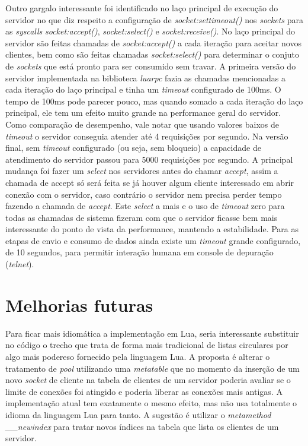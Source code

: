 \documentclass[11pt]{article}
\begin{document}
Outro gargalo interessante foi identificado no laço principal de execução do
servidor no que diz respeito a configuração de \textit{socket:settimeout()} nos
\textit{sockets} para as \textit{syscalls} \textit{socket:accept()},
\textit{socket:select()} e \textit{socket:receive()}. No laço principal do
servidor são feitas chamadas de \textit{socket:accept()} a cada iteração para
aceitar novos clientes, bem como são feitas chamadas \textit{socket:select()}
para determinar o conjuto de \textit{sockets} que está pronto para ser consumido
sem travar. A primeira versão do servidor implementada na biblioteca
\textit{luarpc} fazia as chamadas mencionadas a cada iteração do laço principal
e tinha um \textit{timeout} configurado de 100ms. O tempo de 100ms pode parecer
pouco, mas quando somado a cada iteração do laço principal, ele tem um efeito
muito grande na performance geral do servidor. Como comparação de desempenho,
vale notar que usando valores baixos de \textit{timeout} o servidor conseguia
atender até 4 requisições por segundo. Na versão final, sem \textit{timeout}
configurado (ou seja, sem bloqueio) a capacidade de atendimento do servidor
passou para 5000 requisições por segundo. A principal mudança foi fazer um
\textit{select} nos servidores antes do chamar \textit{accept}, assim a chamada
de accept só será feita se já houver algum cliente interessado em abrir conexão
com o servidor, caso contrário o servidor nem precisa perder tempo fazendo a
chamada de \textit{accept}. Este \textit{select} a mais e o uso de
\textit{timeout} zero para todas as chamadas de sistema fizeram com que o
servidor ficasse bem mais interessante do ponto de vista da performance,
mantendo a estabilidade. Para as etapas de envio e consumo de dados ainda existe
um \textit{timeout} grande configurado, de 10 segundos, para permitir interação
humana em console de depuração (\textit{telnet}).

\section{Melhorias futuras}\label{sec:future}

Para ficar mais idiomática a implementação em Lua, seria interessante
substituir no código o trecho que trata de forma mais tradicional de listas
circulares por algo mais podereso fornecido pela linguagem Lua. A proposta é
alterar o tratamento de \textit{pool} utilizando uma
\textit{metatable}\cite{metat} que no momento da inserção de um novo
\textit{socket} de cliente na tabela de clientes de um servidor poderia avaliar
se o limite de conexões foi atingido e poderia liberar as conexões mais
antigas. A implementação atual tem exatamente o mesmo efeito, mas não usa
totalmente o idioma da linguagem Lua para tanto. A sugestão é utilizar o
\textit{metamethod} \textit{\_\_newindex} para tratar novos índices na tabela que
lista os clientes de um servidor.
\end{document}
